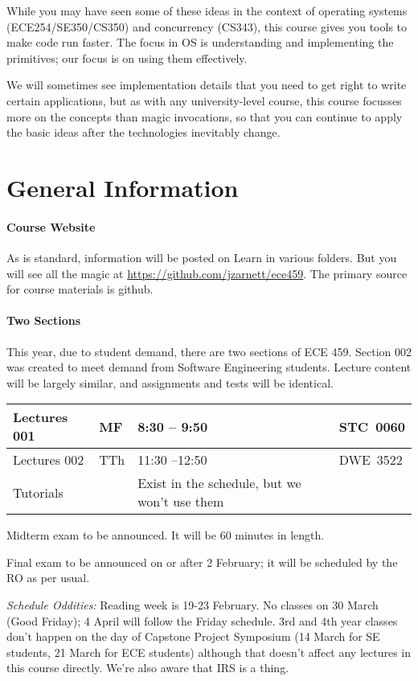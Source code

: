 \documentclass[letterpaper,10pt]{article}
\begin{document}
While you may have seen some of these ideas in the context of
operating systems (ECE254/SE350/CS350) and concurrency (CS343), this course gives you tools to make code run
faster. The focus in OS is understanding and implementing the
primitives; our focus is on using them effectively. 

We will sometimes see implementation details that you need to get right to write
certain applications, but as with any university-level course, this course
focusses more on the concepts than magic invocations, so that you can continue
to apply the basic ideas after the technologies inevitably change.


\section*{General Information}

\paragraph{Course Website} As is standard, information will be posted on Learn in various folders. But you will see all the magic at \url{https://github.com/jzarnett/ece459}. The primary source for course materials is github.


 \paragraph{Two Sections} This year, due to student demand, there are two sections of ECE 459. Section 002 was created to meet demand from Software Engineering students. Lecture content will be largely similar, and assignments and tests will be identical.


\noindent
\hspace*{2em} \begin{tabular}{l|l|l|l}
  Lectures 001 & MF & 8:30 -- 9:50 & STC~0060\\ \hline
  Lectures 002 & TTh & 11:30 --12:50 & DWE~3522\\ \hline
  Tutorials &  &  Exist in the schedule, but we won't use them& \\
  \end{tabular}
  
Midterm exam to be announced. It will be 60 minutes in length.
  
Final exam to be announced on or after 2 February; it will be scheduled by the RO as per usual.

\textit{Schedule Oddities:} Reading week is 19-23 February. No classes on 30 March (Good Friday); 4 April will follow the Friday schedule. 3rd and 4th year classes don't happen on the day of Capstone Project Symposium (14 March for SE students, 21 March for ECE students) although that doesn't affect any lectures in this course directly. We're also aware that IRS is a thing.
\end{document}
